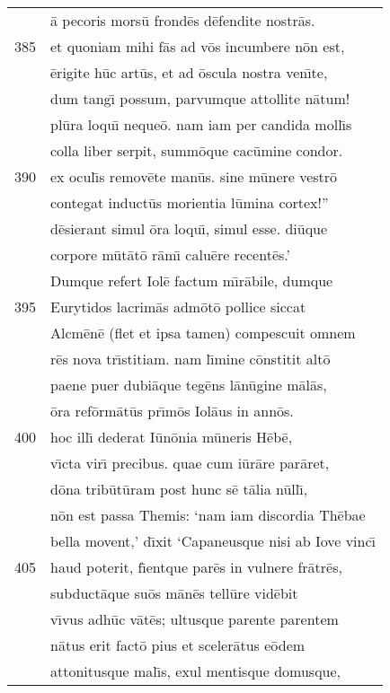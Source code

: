 \documentclass[paper=6in:9in,pagesize=pdftex,
               headinclude=on,footinclude=on,12pt]{scrbook}
\begin{document}
\begin{longtable}[p]{ r l }
 & \=a pecoris mors\=u frond\=es d\=efendite nostr\=as.\\ 
385 & et quoniam mihi f\=as ad v\=os incumbere n\=on est,\\ 
 & \=erigite h\=uc art\=us, et ad \=oscula nostra ven\={\i}te,\\ 
 & dum tang\={\i} possum, parvumque attollite n\=atum!\\ 
 & pl\=ura loqu\={\i} neque\=o. nam iam per candida moll\={\i}s\\ 
 & colla liber serpit, summ\=oque cac\=umine condor.\\ 
390 & ex ocul\={\i}s remov\=ete man\=us. sine m\=unere vestr\=o\\ 
 & contegat induct\=us morientia l\=umina cortex!''\\ 
 & d\=esierant simul \=ora loqu\={\i}, simul esse. di\=uque\\ 
 & corpore m\=ut\=at\=o r\=am\={\i} calu\=ere recent\=es.'\\ 
 & \indent Dumque refert Iol\=e factum m\={\i}r\=abile, dumque\\ 
395 & Eurytidos lacrim\=as adm\=ot\=o pollice siccat\\ 
 & Alcm\=en\=e (flet et ipsa tamen) compescuit omnem\\ 
 & r\=es nova tr\={\i}stitiam. nam l\={\i}mine c\=onstitit alt\=o\\ 
 & paene puer dubi\=aque teg\=ens l\=an\=ugine m\=al\=as,\\ 
 & \=ora ref\=orm\=at\=us pr\={\i}m\=os Iol\=aus in ann\=os.\\ 
400 & hoc ill\={\i} dederat I\=un\=onia m\=uneris H\=eb\=e,\\ 
 & v\={\i}cta vir\={\i} precibus. quae cum i\=ur\=are par\=aret,\\ 
 & d\=ona trib\=ut\=uram post hunc s\=e t\=alia n\=ull\={\i},\\ 
 & n\=on est passa Themis: `nam iam discordia Th\=ebae\\ 
 & bella movent,' d\={\i}xit `Capaneusque nisi ab Iove vinc\={\i}\\ 
405 & haud poterit, f\={\i}entque par\=es in vulnere fr\=atr\=es,\\ 
 & subduct\=aque su\=os m\=an\=es tell\=ure vid\=ebit\\ 
 & v\={\i}vus adh\=uc v\=at\=es; ultusque parente parentem\\ 
 & n\=atus erit fact\=o pius et sceler\=atus e\=odem\\ 
 & attonitusque mal\={\i}s, exul mentisque domusque,\\ 

\end{longtable}
\end{document}
